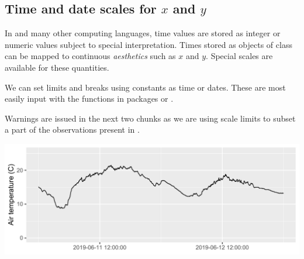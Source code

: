 \documentclass[krantz2]{krantz}\usepackage{knitr}
\begin{document}
\subsection{Time and date scales for $x$ and $y$}\label{sec:plot:scales:time:date}
In \Rlang and many other computing languages, time values are stored as integer or numeric values subject to special interpretation. Times stored as objects of class  can be mapped to continuous \emph{aesthetics} such as $x$ and $y$. Special scales are available for these quantities.

We can set limits and breaks using constants as time or dates. These are most easily input with the functions in packages  or .


\begin{warningbox}
Warnings are issued in the next two chunks as we are using scale limits to subset a part of the observations present in .
\end{warningbox}

\begin{knitrout}\footnotesize
{}\color{fgcolor}\begin{kframe}
\begin{alltt}
\hlstd{(} 
       \hlstd{(}  \hlstd{=}  \hlopt{+}
  \hlstd{()} \hlopt{+}
  \hlstd{(} \hlstd{=} \hlstd{,}
                    \hlstd{=} \hlstd{(}\hlstd{,}  \hlstd{=} \hlstd{)} \hlopt{+} \hlstd{(}\hlopt{:}\hlstd{),}
                    \hlstd{=} \hlstd{(}\hlstd{,}  \hlstd{=} \hlstd{)} \hlopt{+} \hlstd{(}\hlstd{(}\hlstd{,} \hlstd{)))} \hlopt{+}
  \hlstd{(} \hlstd{=} \hlstd{)} \hlopt{+}
  \hlstd{(} \hlstd{=} \hlstd{)}
\end{alltt}


{\ttfamily\noindent\color{warningcolor}{\#\# Warning: Removed 7199 row(s) containing missing values (geom\_path).}}\end{kframe}

{\centering \includegraphics[width=.9\textwidth]{figure/pos-scale-datetime-01-1} 

}


\end{knitrout}
\end{document}
